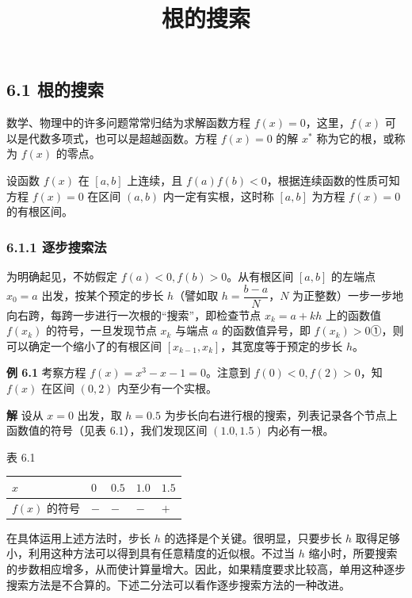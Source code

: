 \documentclass[
  10pt,
  fontset=fandol]{ctexart}
\title{根的搜索}
\author{}
\date{}
\newcounter{none} %
\begin{document}
\maketitle

\subsection{6.1 根的搜索}\label{ux6839ux7684ux641cux7d22}

数学、物理中的许多问题常常归结为求解函数方程 \(f(x)=0\)，这里，\(f(x)\) 可以是代数多项式，也可以是超越函数。方程 \(f(x)=0\) 的解 \(x^*\) 称为它的根，或称为 \(f(x)\) 的零点。

设函数 \(f(x)\) 在 \([a,b]\) 上连续，且 \(f(a)f(b)<0\)，根据连续函数的性质可知方程 \(f(x)=0\) 在区间 \((a,b)\) 内一定有实根，这时称 \([a,b]\) 为方程 \(f(x)=0\) 的有根区间。

\subsubsection{6.1.1 逐步搜索法}\label{ux9010ux6b65ux641cux7d22ux6cd5}

为明确起见，不妨假定 \(f(a)<0,f(b)>0\)。从有根区间 \([a,b]\) 的左端点 \(x_0=a\) 出发，按某个预定的步长 \(h\)（譬如取 \(h=\dfrac{b-a}{N}\)，\(N\) 为正整数）一步一步地向右跨，每跨一步进行一次根的``搜索''，即检查节点 \(x_k=a+kh\) 上的函数值 \(f(x_k)\) 的符号，一旦发现节点 \(x_k\) 与端点 \(a\) 的函数值异号，即 \(f(x_k)>0\)①，则可以确定一个缩小了的有根区间 \([x_{k-1},x_k]\)，其宽度等于预定的步长 \(h\)。

\textbf{例 6.1} 考察方程 \(f(x)=x^3-x-1=0\)。注意到 \(f(0)<0,f(2)>0\)，知 \(f(x)\) 在区间 \((0,2)\) 内至少有一个实根。

\textbf{解} 设从 \(x=0\) 出发，取 \(h=0.5\) 为步长向右进行根的搜索，列表记录各个节点上函数值的符号（见表 6.1），我们发现区间 \((1.0,1.5)\) 内必有一根。

表 6.1

{\def\LTcaptype{none} %
\begin{longtable}[]{@{}lllll@{}}
\toprule\noalign{}
\(x\) & \(0\) & \(0.5\) & \(1.0\) & \(1.5\) \\
\midrule\noalign{}
\endhead
\bottomrule\noalign{}
\endlastfoot
\(f(x)\) 的符号 & \(-\) & \(-\) & \(-\) & \(+\) \\
\end{longtable}
}

在具体运用上述方法时，步长 \(h\) 的选择是个关键。很明显，只要步长 \(h\) 取得足够小，利用这种方法可以得到具有任意精度的近似根。不过当 \(h\) 缩小时，所要搜索的步数相应增多，从而使计算量增大。因此，如果精度要求比较高，单用这种逐步搜索方法是不合算的。下述二分法可以看作逐步搜索方法的一种改进。
\end{document}
